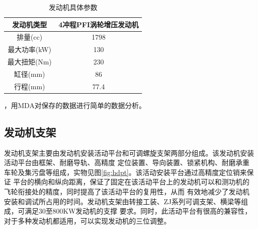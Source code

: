 \begin{table}[ht]
	\centering
	\caption{发动机具体参数}
	\label{tab:ice}
	\begin{tabular}{c|c}
		\hline
		发动机类型 & 4冲程PFI涡轮增压发动机 \\\hline
		排量(cc) & 1798 \\\hline
		最大功率(kW) & 130 \\\hline
		最大扭矩(Nm) & 230 \\\hline
		缸径(mm) & 86 \\\hline
		行程(mm) & 77.4 \\\hline
	\end{tabular}
\end{table}
，用MDA对保存的数据进行简单的数据分析。

\subsection{发动机支架}
发动机支架主要由发动机安装活动平台和可调螺旋支架两部分组成。该发动机安装活动平台由框架、耐磨导轨、高精度
定位装置、导向装置、锁紧机构、耐磨承重车轮及集污盘等组成，实物见图\ref{fig:hdpt}。该活动安装平台通过高精度定位销来保证
平台的横向和纵向距离，保证了固定在该活动平台上的发动机可以和测功机的飞轮衔接处的精度，同时提高了该活动平台的复用性，从而
有效地减少了发动机安装和调试所占用的时间。发动机支架由转接工装、ZJ系列可调支架、横梁等组成，可满足30至800KW发动机的支撑
要求。同时，此活动平台有很高的兼容性，对于多种发动机都适用，可以实现发动机的三位调整。
